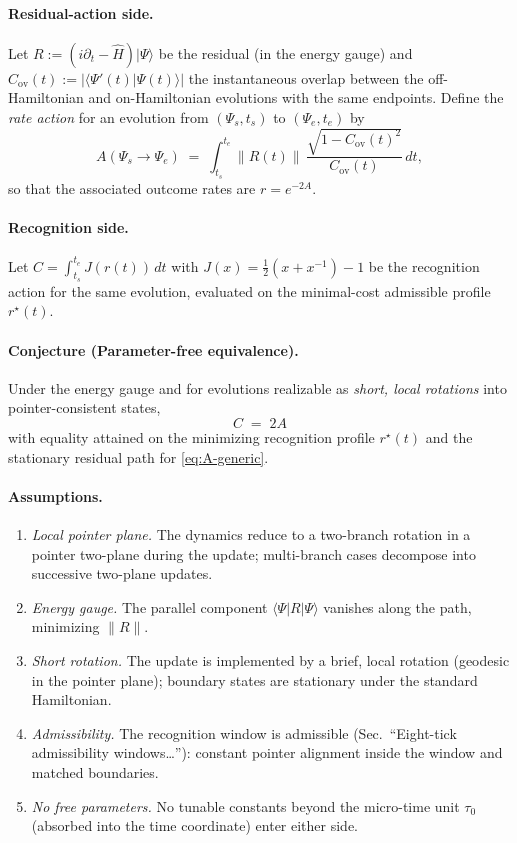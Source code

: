 \documentclass[11pt,letterpaper]{article}
\begin{document}
\paragraph{Residual-action side.}
Let \(R:=(i\partial_t-\hat H)\lvert\Psi\rangle\) be the residual (in the energy gauge) and \(C_{\mathrm{ov}}(t):=|\langle \Psi'(t)\vert\Psi(t)\rangle|\) the instantaneous overlap between the off-Hamiltonian and on-Hamiltonian evolutions with the same endpoints. Define the \emph{rate action} for an evolution from \((\Psi_s,t_s)\) to \((\Psi_e,t_e)\) by
\begin{equation}
A(\Psi_s\!\to\!\Psi_e)\;=\;\int_{t_s}^{t_e}\!\! \|R(t)\|\,\frac{\sqrt{1-C_{\mathrm{ov}}(t)^2}}{C_{\mathrm{ov}}(t)}\,dt,
\label{eq:A-generic}
\end{equation}
so that the associated outcome rates are \(r=e^{-2A}\).

\paragraph{Recognition side.}
Let \(C=\int_{t_s}^{t_e}J(r(t))\,dt\) with \(J(x)=\frac12(x+x^{-1})-1\) be the recognition action for the same evolution, evaluated on the minimal-cost admissible profile \(r^\star(t)\).

\paragraph{Conjecture (Parameter-free equivalence).}
Under the energy gauge and for evolutions realizable as \emph{short, local rotations} into pointer-consistent states,
\begin{equation}
\boxed{\quad C\;=\;2A \quad}
\label{eq:equivalence}
\end{equation}
with equality attained on the minimizing recognition profile \(r^\star(t)\) and the stationary residual path for \eqref{eq:A-generic}. 

\paragraph{Assumptions.}
\begin{enumerate}
\item \emph{Local pointer plane.} The dynamics reduce to a two-branch rotation in a pointer two-plane during the update; multi-branch cases decompose into successive two-plane updates.
\item \emph{Energy gauge.} The parallel component \(\langle\Psi|R|\Psi\rangle\) vanishes along the path, minimizing \(\|R\|\).
\item \emph{Short rotation.} The update is implemented by a brief, local rotation (geodesic in the pointer plane); boundary states are stationary under the standard Hamiltonian.
\item \emph{Admissibility.} The recognition window is admissible (Sec.~``Eight-tick admissibility windows\ldots''): constant pointer alignment inside the window and matched boundaries.
\item \emph{No free parameters.} No tunable constants beyond the micro-time unit \(\tau_0\) (absorbed into the time coordinate) enter either side.
\end{enumerate}
\end{document}
